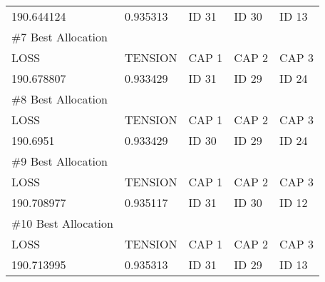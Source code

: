 \documentclass[12pt]{article}
\begin{document}
\begin{table}[]
\begin{tabular}{lllll}
			190.644124                             & 0.935313 & ID 31 & ID 30 & ID 13 \vspace{0.3cm} \\
			\#7 Best Allocation                    &          &       &       &       \\ \hline
			LOSS                                   & TENSION  & CAP 1 & CAP 2 & CAP 3 \\
			190.678807                             & 0.933429 & ID 31 & ID 29 & ID 24 \vspace{0.3cm} \\
			\#8 Best Allocation                    &          &       &       &       \\ \hline
			LOSS                                   & TENSION  & CAP 1 & CAP 2 & CAP 3 \\
			190.6951                               & 0.933429 & ID 30 & ID 29 & ID 24 \vspace{0.3cm} \\
			\#9 Best Allocation                    &          &       &       &       \\ \hline
			LOSS                                   & TENSION  & CAP 1 & CAP 2 & CAP 3 \\
			190.708977                             & 0.935117 & ID 31 & ID 30 & ID 12 \vspace{0.3cm} \\
			\#10 Best Allocation                   &          &       &       &       \\ \hline
			LOSS                                   & TENSION  & CAP 1 & CAP 2 & CAP 3 \\
			190.713995                             & 0.935313 & ID 31 & ID 29 & ID 13 \\
		\end{tabular}
	\end{table}
	
	
\end{document}
